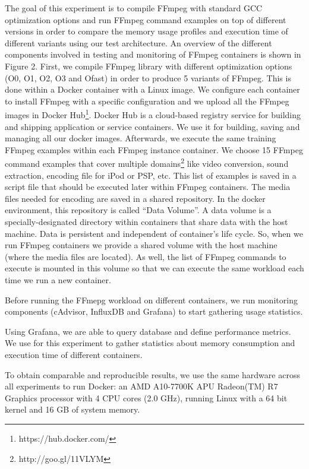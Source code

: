 The goal of this experiment is to compile FFmpeg with standard GCC optimization options and run FFmpeg command examples on top of different versions in order to compare the memory usage profiles and execution time of different variants using our test architecture. 
An overview of the different components involved in testing and monitoring of FFmpeg containers is shown in Figure 2. 
First, we compile FFmpeg library with different optimization options  (O0, O1, O2, O3 and Ofast) in order to produce 5 variants of FFmpeg. 
This is done within a Docker container with a Linux image. We configure
each container to install FFmpeg with a specific configuration and we upload all the FFmpeg images in Docker Hub\footnote{https://hub.docker.com/}.
Docker Hub is a cloud-based registry service for building and shipping application or
service containers. 
We  use it for building, saving and managing all our docker images.
Afterwards, we execute the same training FFmpeg examples within each FFmpeg instance container. We choose 15 FFmpeg command examples that cover multiple domains\footnote{http://goo.gl/11VLYM} like video conversion, sound extraction, encoding file for iPod or PSP, etc. 
This list of examples is saved in a script file that should be executed later within FFmpeg containers. 
The media files needed for encoding are saved in a shared repository. 
In the docker environment, this repository is called “Data Volume”. 
A data volume is a specially-designated directory within containers that share data with the host machine. 
Data is persistent and independent of container's life cycle. So, when we run FFmpeg containers we provide a shared volume with the host
machine (where the media files are located). As well, the list of FFmpeg commands to execute is mounted in this volume so that we can execute the same workload each time we run a new container.

Before running the FFmepg workload on different containers, we run monitoring components (cAdvisor, InfluxDB and Grafana) to start gathering usage statistics.

Using Grafana, we are able to query database and define performance metrics. We use for this experiment to gather statistics about memory consumption and execution time of different containers. 

To obtain comparable and reproducible results, we use the same hardware across all experiments to run Docker: an AMD A10-7700K APU Radeon(TM) R7 Graphics processor with 4 CPU cores (2.0 GHz), running Linux with a 64 bit kernel and 16 GB of system memory.

